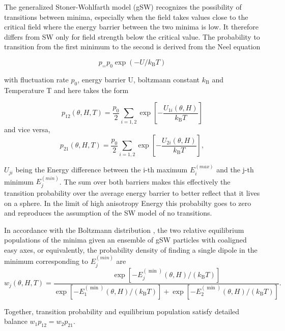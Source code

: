 \documentclass[12pt, DIV=12]{scrartcl}
\begin{document}
The generalized Stoner-Wohlfarth model (gSW) \cite{Chuev2007} recognizes the possibility  of transitions between minima, especially when the field takes values close to the critical field where the energy barrier between the two minima is low. It therefore differs from SW only for field strength below the critical value.
The probability to transition from the first minimum to the second is derived from the Neel equation \cite{Bean1959}

\begin{equation}
    p_ = p_0 \exp(-U/k_\mathrm{B} T)
    \label{eqn_Neel}
\end{equation}

with fluctuation rate $p_0$, energy barrier U, boltzmann constant $k_\mathrm{B}$ and Temperature T and here takes the form

\begin{equation}
    p_{12}(\theta, H, T) = \frac{p_0}{2} \sum_{i=1,2} \exp\left[-\frac{U_{1i}(\theta, H)}{k_\mathrm{B} T}\right]
    \label{eqn_transition_probability1}
\end{equation}
and vice versa,
\begin{equation}
    p_{21}(\theta, H, T) = \frac{p_0}{2} \sum_{i=1,2} \exp\left[-\frac{U_{2i}(\theta, H)}{k_\mathrm{B} T}\right],
    \label{eqn_transition_probability2}
\end{equation}

$U_{ji}$ being the Energy difference between the i-th maximum $E_i^{(max)}$ and the j-th minimum $E_j^{(min)}$. The sum over both barriers makes this effectively the transition probability over the average energy barrier to better reflect that it lives on a sphere. In the limit of high anisotropy Energy this probabilty goes to zero and reproduces the assumption of the SW model of no transitions.

In accordance with the Boltzmann distribution \cite{Boltzmann2012}, the two relative equilibrium populations of the minima given an ensemble of gSW particles with coaligned easy axes, or equivalently, the probability density of finding a single dipole in the minimum corresponding to $E_j^{(min)}$ are
\begin{equation}
    w_j(\theta,H,T) =
    \frac{ \exp\left[-E_j^{(\min)}(\theta,H)/(k_\mathrm{B} T)\right]}
    {\exp\left[-E_1^{(\min)}(\theta,H)/(k_\mathrm{B} T)\right]+
        \exp\left[-E_2^{(\min)}(\theta,H)/(k_\mathrm{B} T)\right]}.
    \label{eqn_population}
\end{equation}

Together, transition probability and equilibrium population satisfy detailed balance $w_1 p_{12} = w_2 p_{21}$.
\end{document}
